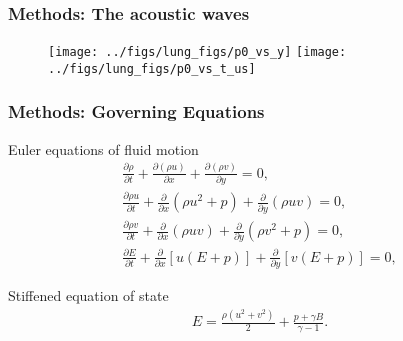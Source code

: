 \begin{frame} \frametitle{Methods: The acoustic waves}
  \begin{figure}
    \centering
      \texttt{[image: ../figs/lung\_figs/p0\_vs\_y]}%
      \texttt{[image: ../figs/lung\_figs/p0\_vs\_t\_us]}%
  \end{figure}
\end{frame}
\begin{frame} \frametitle{Methods: Governing Equations}
Euler equations of fluid motion
  \begin{align*}%
    \frac{\partial \rho}{\partial t} + \frac{\partial \left(\rho u\right)}{\partial x} + \frac{\partial \left(\rho v\right)}{\partial y} = 0,\\
    \frac{\partial \rho u}{\partial t} + \frac{\partial}{\partial x}\left( \rho u^2+p\right)  + \frac{\partial}{\partial y}\left( \rho uv\right) = 0,\\
    \frac{\partial \rho v}{\partial t} + \frac{\partial}{\partial x}\left( \rho uv\right)  + \frac{\partial}{\partial y}\left( \rho v^2+p\right) = 0,\\
    \frac{\partial E}{\partial t} + \frac{\partial}{\partial x}\left[u\left(E+p\right)\right] + \frac{\partial}{\partial y}\left[v\left(E+p\right)\right] = 0,
  \end{align*}%

Stiffened equation of state
\begin{align*} \label{eq:stiffened_eos}%
  E=\frac{\rho\left(u^2+v^2\right)}{2} + \frac{p+\gamma B}{\gamma-1}.
\end{align*}
\end{frame}


